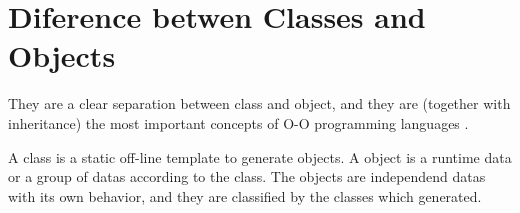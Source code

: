 \section{Diference betwen Classes and Objects}
\label{sec:Diference-betwen-Classes-and-Objects}

They are a clear separation between 
class and object, 
and they are (together with inheritance) 
the most important concepts of O-O programming 
languages \cite{Dahl:1970}. 

A class is a static off-line 
template to generate objects. 
A object is a runtime data 
or a group of datas 
according to the class. The objects are 
independend datas with 
its own behavior, and 
they are classified by the classes 
which generated.

